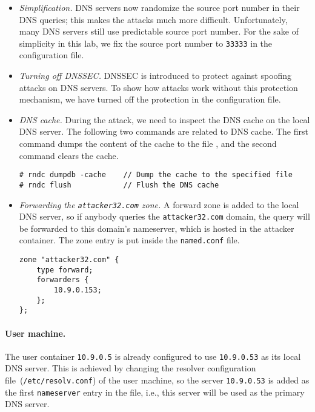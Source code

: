 \begin{itemize}
\item \textit{Simplification.}
DNS servers now randomize
the source port number in their DNS queries; this makes the attacks much more
difficult. Unfortunately, many DNS servers still use predictable source
port number.  For the sake of simplicity in this lab, we fix the
source port number to  {\tt 33333} in the 
configuration file. 

\item \textit{Turning off DNSSEC.} 
DNSSEC is introduced to protect against spoofing attacks on DNS servers.
To show how attacks work
without this protection mechanism, we have turned off the protection 
in the configuration file. 


\item \textit{DNS cache.}
During the attack, we need to inspect the DNS cache on the local DNS server.
The following two commands are related to DNS cache.
The first command dumps the content of the cache to the file 
, 
and the second command clears the cache.

\begin{lstlisting}
# rndc dumpdb -cache    // Dump the cache to the specified file
# rndc flush            // Flush the DNS cache
\end{lstlisting}

\item \textit{Forwarding the \texttt{attacker32.com} zone.}
A forward zone is added to the local DNS server,
so if anybody queries the \texttt{attacker32.com} domain, 
the query will be forwarded to this domain's nameserver, which
is hosted in the attacker container. The zone entry
is put inside the \texttt{named.conf} file. 

\begin{lstlisting}
zone "attacker32.com" {
    type forward;
    forwarders { 
        10.9.0.153; 
    };
};
\end{lstlisting}
\end{itemize}



\paragraph{User machine.}
The user container {\tt 10.9.0.5} is already 
configured to use {\tt 10.9.0.53} as its local DNS server.
This is achieved by changing
the resolver configuration file~(\texttt{/etc/resolv.conf}) of the user machine,
so the server \texttt{10.9.0.53} is added as the first \texttt{nameserver} entry in the file, i.e.,
this server will be used as the primary DNS server.


